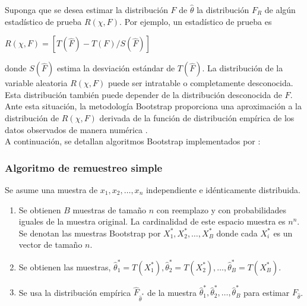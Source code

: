 Suponga que se desea estimar la distribución $F$ de $\hat{\theta}$ la distribución $F_{R}$ de algún estadístico de prueba $R( \chi, F)$. Por ejemplo, un estadístico de prueba es\\

\begin{center}
	$ R( \chi, F) = [T(\hat{F}) - T(F)/S(\hat{F})]$\\
\end{center}

donde $S(\hat{F})$ estima la desviación estándar de $T(\hat{F})$. La distribución de la variable aleatoria $R( \chi, F)$ puede ser intratable o completamente desconocida. Esta distribución también puede depender de la distribución desconocida de $F$. Ante esta situación, la metodología Bootstrap proporciona una aproximación a la distribución de $R( \chi, F)$ derivada de la función de distribución empírica de los datos observados de manera numérica \parencite{balam-2012}.\\

A continuación, se detallan algoritmos Bootstrap implementados por \textcite{balam-2012}:\\

\subsubsection{Algoritmo de remuestreo simple \parencite{balam-2012}}

Se asume una muestra de $ x_{1}, x_{2},  \dots,  x_{n}$ independiente e idénticamente distribuida.

\begin{enumerate}
	\item Se obtienen $B$ muestras de tamaño $n$ con reemplazo y con probabilidades iguales de la muestra original. La cardinalidad de este espacio muestra es $n^{n}$. Se denotan las muestras Bootstrap por $X^{*}_{1}, X^{*}_{2},  \dots, X^{*}_{B}$ donde cada $X^{*}_{i}$ es un vector de tamaño $n$.
	
	\item Se obtienen las muestras, $\hat{\theta}^{*}_{1} = T (X^{*}_{1}) , \hat{\theta}^{*}_{2} = T (X^{*}_{2}), \dots,\hat{\theta}^{*}_{B} = T (X^{*}_{B})$.
	
	\item Se usa la distribución empírica $\hat{F}_{\hat{\theta}^{*}}$ de la muestra $\hat{\theta}^{*}_{1},\hat{\theta}^{*}_{2},  \dots, \hat{\theta}^{*}_{B}$ para estimar $F_{\hat{\theta}} $.
\end{enumerate}

